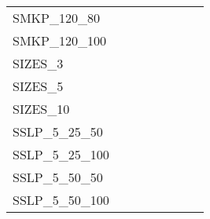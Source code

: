 \begin{table}[H]
{\begin{tabular}{|l|ll|ll|l|l|l|}
			SMKP\_120\_80                  &                                 &                                &                                  &                                 &                                    &                            &                            \\
			SMKP\_120\_100                 &                                 &                                &                                  &                                 &                                    &                            &                            \\ \hline
			SIZES\_3                       &                                 &                                &                                  &                                 &                                    &                            &                            \\
			SIZES\_5                       &                                 &                                &                                  &                                 &                                    &                            &                            \\
			SIZES\_10                      &                                 &                                &                                  &                                 &                                    &                            &                            \\ \hline
			SSLP\_5\_25\_50                &                                 &                                &                                  &                                 &                                    &                            &                            \\
			SSLP\_5\_25\_100               &                                 &                                &                                  &                                 &                                    &                            &                            \\
			SSLP\_5\_50\_50                &                                 &                                &                                  &                                 &                                    &                            &                            \\
			SSLP\_5\_50\_100               &                                 &                                &                                  &                                 &                                    &                            &                            \\

\end{tabular}}
\end{table}
